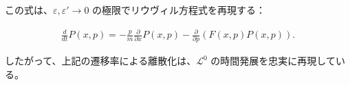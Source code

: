 \documentclass[a4paper,11pt]{jsarticle}
\numberwithin{equation}{section}
\begin{document}
この式は、$\varepsilon, \varepsilon' \to 0$ の極限でリウヴィル方程式を再現する：

\begin{align}
\frac{d}{dt} P(x, p)
= -\frac{p}{m} \frac{\partial}{\partial x} P(x, p)
- \frac{\partial}{\partial p} \left( F(x, p) P(x, p) \right).
\end{align}

したがって、上記の遷移率による離散化は、$\mathcal{L}^0$ の時間発展を忠実に再現している。






\end{document}
